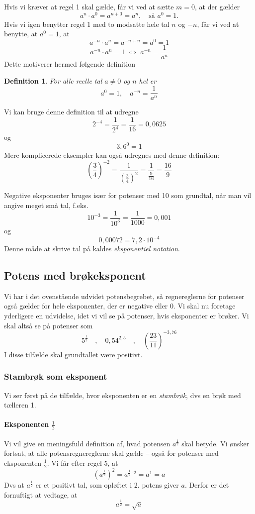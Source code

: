 \documentclass[12pt,oneside,a4paper]{article}
\theoremstyle{plain}
\newtheorem*{mydef}{Definition}
\begin{document}
Hvis vi kræver at regel 1 skal gælde, får vi ved at sætte $m=0$, at der gælder
$$
a^n \cdot a^0 = a^{n+0} = a^n,\quad \mbox{så $a^0=1$.}
$$
Hvis vi igen benytter regel 1 med to modsatte hele tal $n$ og $-n$, får vi ved at benytte, at $a^0=1$, at
$$
a^{-n} \cdot a^n = a^{-n+n} = a^0 = 1
$$
$$
a^{-n} \cdot a^n = 1 \,\,\Leftrightarrow \,\,a^{-n} = \frac{1}{a^n}
$$
Dette motiverer hermed følgende definition
\begin{mydef}
    For alle reelle tal $a\neq 0$ og $n$ hel er
    $$
    a^0 = 1,\quad a^{-n} = \frac{1}{a^n}
    $$
\end{mydef}

Vi kan bruge denne definition til at udregne
$$
2^{-4} = \frac{1}{2^4} = \frac{1}{16} = 0,0625
$$
og
$$
3,6^0 = 1
$$
Mere komplicerede eksempler kan også udregnes med denne definition:
$$
\left(\frac{3}{4}\right)^{-2} = \frac{1}{\left(\frac{3}{4}\right)^2} = \frac{1}{\frac{9}{16}} = \frac{16}{9}
$$

Negative eksponenter bruges især for potenser med 10 som grundtal, når man vil angive meget små tal, f.eks.
$$
10^{-3} = \frac{1}{10^3} = \frac{1}{1000} = 0,001
$$
og
$$
0,00072 = 7,2\cdot 10^{-4}
$$
Denne måde at skrive tal på kaldes {\em eksponentiel notation}.


\subsection*{Potens med brøkeksponent}
Vi har i det ovenstående udvidet potensbegrebet, så regnereglerne for potenser også gælder for hele eksponenter, der er negative eller 0. Vi skal nu foretage yderligere en udvidelse, idet vi vil se på potenser, hvis eksponenter er brøker. Vi skal altså se på potenser som
$$
5^{\frac12} \quad,\quad 0,54^{2,5} \quad,\quad
\left(\frac{23}{11}\right)^{-3,76}
$$
I disse tilfælde skal grundtallet være positivt.

\subsubsection*{Stambrøk som eksponent}
Vi ser først på de tilfælde, hvor eksponenten er en {\em stambrøk}, dvs en brøk
med tælleren 1.

\paragraph*{Eksponenten $\frac12$}
Vi vil give en meningsfuld definition af, hvad potensen $a^{\frac12}$ skal
betyde.  Vi ønsker fortsat, at alle potensregnereglerne skal gælde -- også for
potenser med eksponenten $\frac12$. Vi får efter regel 5, at 
$$
\left(a^{\frac12}\right)^2 = a^{\frac12 \cdot 2} = a^1 = a
$$
Dvs at $a^\frac12$ er et positivt tal, som opløftet i 2. potens giver $a$.
Derfor er det fornuftigt at vedtage, at
$$
a^\frac12 = \sqrt{a}
$$
\end{document}
